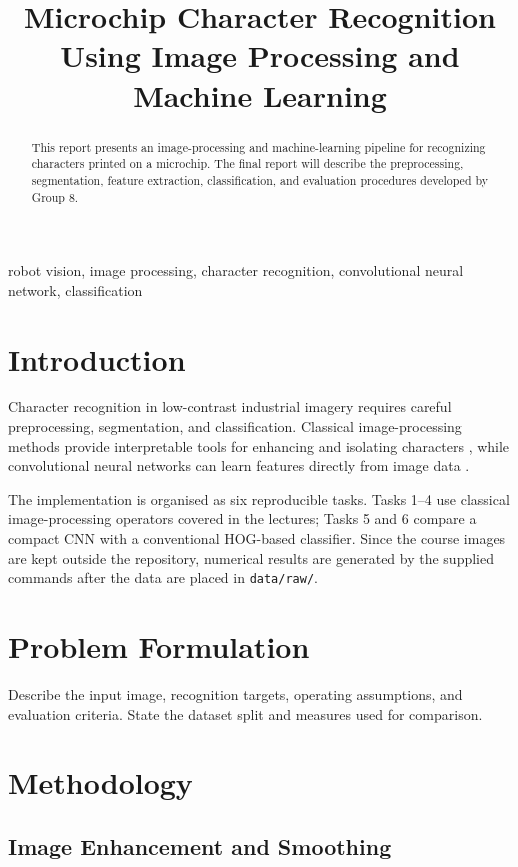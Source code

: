 \documentclass[conference]{IEEEtran}
\title{Microchip Character Recognition Using Image Processing and Machine Learning}
\author{
  \IEEEauthorblockN{Group 8}
  \IEEEauthorblockA{
    ME5411 Robot Vision and AI\\
    National University of Singapore\\
    Singapore
  }
}
\begin{document}
\maketitle

\begin{abstract}
This report presents an image-processing and machine-learning pipeline for
recognizing characters printed on a microchip. The final report will describe
the preprocessing, segmentation, feature extraction, classification, and
evaluation procedures developed by Group 8.
\end{abstract}

\begin{IEEEkeywords}
robot vision, image processing, character recognition, convolutional neural
network, classification
\end{IEEEkeywords}

\section{Introduction}
Character recognition in low-contrast industrial imagery requires careful
preprocessing, segmentation, and classification. Classical image-processing
methods provide interpretable tools for enhancing and isolating characters
\cite{gonzalez2018digital}, while convolutional neural networks can learn
features directly from image data \cite{lecun1998gradient}.

The implementation is organised as six reproducible tasks. Tasks 1--4 use
classical image-processing operators covered in the lectures; Tasks 5 and 6
compare a compact CNN with a conventional HOG-based classifier. Since the
course images are kept outside the repository, numerical results are generated
by the supplied commands after the data are placed in \texttt{data/raw/}.

\section{Problem Formulation}
Describe the input image, recognition targets, operating assumptions, and
evaluation criteria. State the dataset split and measures used for comparison.

\section{Methodology}

\subsection{Image Enhancement and Smoothing}
\end{document}
